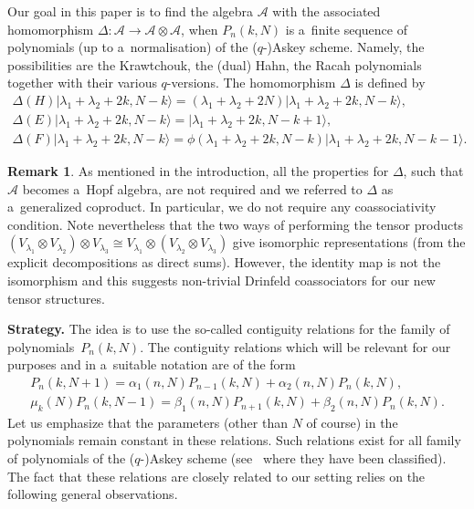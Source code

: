 \documentclass[pdftex]{sigma}
\numberwithin{equation}{section}
\theoremstyle{definition}
\newtheorem{Remark}[Theorem]{Remark}
\begin{document}
Our goal in this paper is to find the algebra $\mathcal{A}$ with the associated homomorphism $\Delta\colon \mathcal{A}\to \mathcal{A}\otimes \mathcal{A}$, when $P_n(k,N)$ is a~finite sequence of polynomials (up to a~normalisation) of the ($q$-)Askey scheme.
 Namely, the possibilities are the Krawtchouk, the (dual) Hahn, the Racah polynomials together with their various $q$-versions.
The homomorphism $\Delta$ is defined by
\begin{gather*}
\Delta(H)|\lambda_1+\lambda_2+2k,N-k\rangle=(\lambda_1+\lambda_2+2N)|\lambda_1+\lambda_2+2k,N-k\rangle,\\
 \Delta(E)|\lambda_1+\lambda_2+2k,N-k\rangle=|\lambda_1+\lambda_2+2k,N-k+1\rangle,\\
 \Delta(F)|\lambda_1+\lambda_2+2k,N-k\rangle=\phi(\lambda_1+\lambda_2+2k,N-k)|\lambda_1+\lambda_2+2k,N-k-1\rangle.
\end{gather*}

\begin{Remark} \label{rem:iso}
As mentioned in the introduction, all the properties for $\Delta$, such that $\mathcal{A}$ becomes a~Hopf algebra, are not required and we referred to $\Delta$ as a~generalized coproduct. In particular, we do not require any coassociativity condition. Note nevertheless that the two ways of performing the tensor products
$(V_{\lambda_1}\otimes V_{\lambda_2})\otimes V_{\lambda_3}\cong V_{\lambda_1}\otimes(V_{\lambda_2}\otimes V_{\lambda_3})$
give isomorphic representations (from the explicit decompositions as direct sums). However, the identity map is not the isomorphism and this suggests non-trivial Drinfeld coassociators for our new tensor structures.
\end{Remark}

{\bf Strategy.} The idea is to use the so-called contiguity relations for the family of polynomials~$P_n(k,N)$. The contiguity relations which will be relevant for our purposes and in a~suitable notation are of the form
\begin{gather}\label{contiguity1}
P_n(k,N+1)=\alpha_1(n,N)P_{n-1}(k,N)+\alpha_2(n,N)P_n(k,N),\\
\label{contiguity2}
\mu_k(N)P_n(k,N-1)=\beta_1(n,N)P_{n+1}(k,N)+\beta_2(n,N) P_n(k,N).
\end{gather}
 Let us emphasize that the parameters (other than $N$ of course) in the polynomials remain constant in these relations. Such relations exist for all family of polynomials of the ($q$-)Askey scheme (see~\cite{contiguity} where they have been classified). The fact that these relations are closely related to our setting relies on the following general observations.
\end{document}

